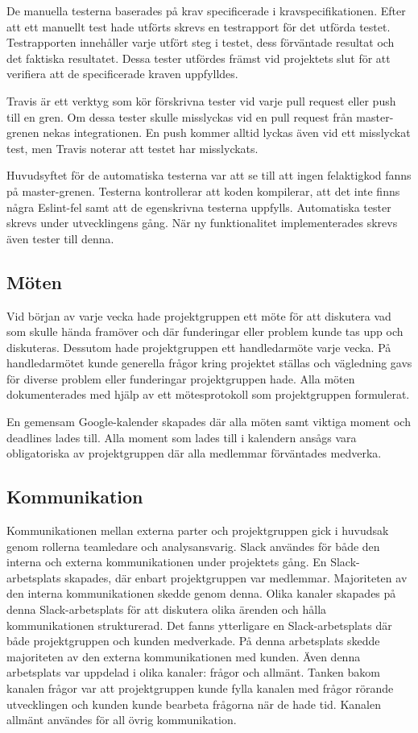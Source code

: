 De manuella testerna baserades på krav specificerade i kravspecifikationen. Efter att ett manuellt test hade utförts skrevs en testrapport för det utförda testet. Testrapporten innehåller varje utfört steg i testet, dess förväntade resultat och det faktiska resultatet. Dessa tester utfördes främst vid projektets slut för att verifiera att de specificerade kraven uppfylldes.

Travis är ett verktyg som kör förskrivna tester vid varje pull request eller push till en gren. Om dessa tester skulle misslyckas vid en pull request från master-grenen nekas integrationen. En push kommer alltid lyckas även vid ett misslyckat test, men Travis noterar att testet har misslyckats.

Huvudsyftet för de automatiska testerna var att se till att ingen felaktigkod fanns på master-grenen. Testerna kontrollerar att koden kompilerar, att det inte finns några Eslint-fel samt att de egenskrivna testerna uppfylls. Automatiska tester skrevs under utvecklingens gång. När ny funktionalitet implementerades skrevs även tester till denna. 

\subsection{Möten}
Vid början av varje vecka hade projektgruppen ett möte för att diskutera vad som skulle hända framöver och där funderingar eller problem kunde tas upp och diskuteras. Dessutom hade projektgruppen ett handledarmöte varje vecka. På handledarmötet kunde generella frågor kring projektet ställas och vägledning gavs för diverse problem eller funderingar projektgruppen hade. Alla möten dokumenterades med hjälp av ett mötesprotokoll som projektgruppen formulerat.

En gemensam Google-kalender skapades där alla möten samt viktiga moment och deadlines lades till. Alla moment som lades till i kalendern ansågs vara obligatoriska av projektgruppen där alla medlemmar förväntades medverka.

\subsection{Kommunikation}
Kommunikationen mellan externa parter och projektgruppen gick i huvudsak genom rollerna teamledare och analysansvarig. Slack användes för både den interna och externa kommunikationen under projektets gång. En Slack-arbetsplats skapades, där enbart projektgruppen var medlemmar. Majoriteten av den interna kommunikationen skedde genom denna. Olika kanaler skapades på denna Slack-arbetsplats för att diskutera olika ärenden och hålla kommunikationen strukturerad. Det fanns ytterligare en Slack-arbetsplats där både projektgruppen och kunden medverkade. På denna arbetsplats skedde majoriteten av den externa kommunikationen med kunden. Även denna arbetsplats var uppdelad i olika kanaler: frågor och allmänt. Tanken bakom kanalen frågor var att projektgruppen kunde fylla kanalen med frågor rörande utvecklingen och kunden kunde bearbeta frågorna när de hade tid. Kanalen allmänt användes för all övrig kommunikation.

